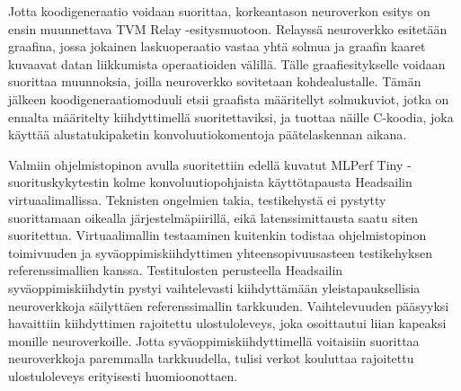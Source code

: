 \documentclass[12pt,a4paper,finnish
]{tunithesis}
\begin{document}
Jotta koodigeneraatio voidaan suorittaa, korkeantason neuroverkon esitys on ensin muunnettava TVM Relay -esitysmuotoon.
Relayssä neuroverkko esitetään graafina, jossa jokainen laskuoperaatio vastaa yhtä solmua ja graafin kaaret kuvaavat datan liikkumista operaatioiden välillä.
Tälle graafiesitykselle voidaan suorittaa muunnoksia, joilla neuroverkko sovitetaan kohdealustalle.
Tämän jälkeen koodigeneraatiomoduuli etsii graafista määritellyt solmukuviot, jotka on ennalta määritelty kiihdyttimellä suoritettaviksi, ja tuottaa näille C-koodia, joka käyttää alustatukipaketin konvoluutiokomentoja päätelaskennan aikana.

Valmiin ohjelmistopinon avulla suoritettiin edellä kuvatut MLPerf Tiny -suo\-ri\-tus\-ky\-ky\-tes\-tin kolme konvoluutiopohjaista käyttötapausta Headsailin virtuaalimallissa.
Teknisten ongelmien takia, testikehystä ei pystytty suorittamaan oikealla jär\-jes\-tel\-mä\-pii\-ri\-llä, eikä latenssimittausta saatu siten suoritettua. Virtuaalimallin testaaminen kuitenkin todistaa ohjelmistopinon toimivuuden ja sy\-vä\-op\-pi\-mis\-kiih\-dy\-tti\-men yhteensopivuusasteen testikehyksen referenssimallien kanssa.
Testitulosten perusteella Headsailin sy\-vä\-op\-pi\-mis\-kiih\-dy\-tin pystyi vaihtelevasti kiihdyttämään yleistapauksellisia neuroverkkoja säilyttäen referenssimallin tarkkuuden.
Vaihtelevuuden pääsyyksi havaittiin kiihdyttimen rajoitettu ulostuloleveys, joka osoittautui liian kapeaksi monille neuroverkoille.
Jotta syväoppimiskiihdyttimellä voitaisiin suorittaa neuroverkkoja paremmalla tarkkuudella, tulisi verkot kouluttaa rajoitettu ulostuloleveys erityisesti huomioonottaen.







%
%
\newpage

\printbibliography[title=Lähteet]


%
\end{document}
